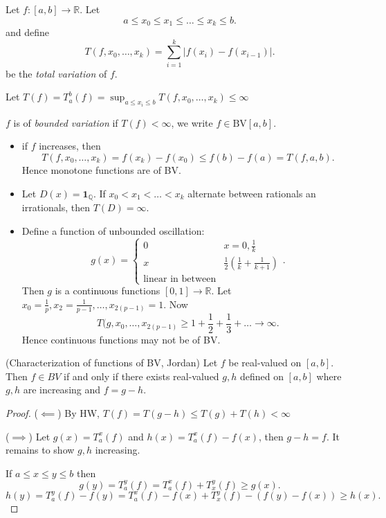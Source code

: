 
Let $f: [a,b] \to  \mathbb{R}$. Let
\[
	a \le  x_0 \le  x_1 \le  \ldots \le  x_k \le b
.\] 
and define
\[
	T(f, x_0, \ldots, x_k) = \sum_{i=1}^{k} \left| f(x_i) - f(x_{i-1}) \right| 
.\] 
be the \textit{total variation} of $f$.

Let $T(f) = T_a^b(f) = \operatorname{sup}_{a\le x_i\le b}T(f, x_0, \ldots, x_k) \le \infty $

\begin{definition}
	$f$ is of \textit{bounded variation} if $T(f) < \infty $, we write $f \in \text{BV}[a,b]$.
\end{definition}

\begin{itemize}
	\item 
		\begin{example}
			if $f$ increases, then
			\[
				T(f, x_0, \ldots, x_k) = f(x_k) - f(x_0) \le f(b) - f(a) = T(f, a, b)
			.\] 
			Hence monotone functions are of BV.
		\end{example}
	\item 
		\begin{example}
			Let $D(x) = \mathbf{1}_{\mathbb{Q}}$. If $x_0<x_1<\ldots<x_k$ alternate between rationals an irrationals, then $T(D) = \infty $.
		\end{example}
	\item 
		\begin{example}
			Define a function of unbounded oscillation:
			\[
				g(x) = \begin{cases}
					0 & x = 0,  \frac{1}{k} \\
					x & \frac{1}{2}(\frac{1}{k} + \frac{1}{k+1})\\
					\text{linear in between}
				\end{cases}
			.\] 
			Then $g$ is a continuous functions $[0,1] \to \mathbb{R}$.
			Let $x_0 = \frac{1}{p}, x_2=\frac{1}{p-1 },\ldots, x_{2(p-1)}=1$.
			Now
			\[
				T(g, x_0, \ldots, x_{2(p-1)} \ge  1  + \frac{1}{2} + \frac{1}{3} + \ldots \to  \infty 
			.\] 
			Hence continuous functions may not be of BV.

		\end{example}
\end{itemize}

\begin{theorem}(Characterization of functions of BV, Jordan)
	Let $f$ be real-valued on $[a,b]$. Then $f \in BV$ if and only if there exists real-valued $g, h$ defined on  $[a,b]$ where $g,h$ are increasing and $f = g - h$.
\end{theorem}
\begin{proof}
	($\impliedby$) By HW, $T(f) = T(g-h) \le T(g) + T(h) < \infty $ 

	($\implies$) Let $g(x) = T_a^x (f)$ and $h(x) = T_a^x(f) - f(x)$, then  $g-h = f$. It remains to show $g, h$ increasing.

	If $a\le x\le y\le b$ then
	\[
		g(y) = T_a^y (f) = T_a^x(f) + T_x^y (f) \ge g(x)
	.\] 
	\[
		h(y) = T_a^y(f) - f(y) = T_a^x (f) - f(x) + T_x^y (f) - \left( f(y) - f(x) \right) \ge h(x)
	.\] 
\end{proof}

